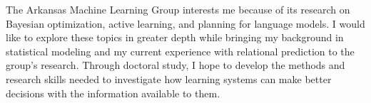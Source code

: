 \documentclass[11pt,letterpaper]{article}
\begin{document}
The Arkansas Machine Learning Group interests me because of its research on Bayesian optimization, active learning, and planning for language models. I would like to explore these topics in greater depth while bringing my background in statistical modeling and my current experience with relational prediction to the group's research. Through doctoral study, I hope to develop the methods and research skills needed to investigate how learning systems can make better decisions with the information available to them.
\end{document}
